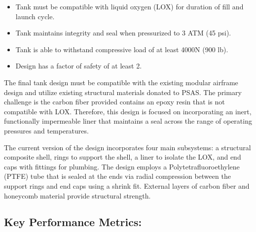 \begin{itemize}[nolistsep]
\item Tank must be compatible with liquid oxygen (LOX) for duration of fill and launch cycle.

\item Tank maintains integrity and seal when pressurized to 3 ATM (45 psi).

\item Tank is able to withstand compressive load of at least 4000N (900 lb).

\item Design has a factor of safety of at least 2.





\end{itemize}
\vspace{0.2cm}
The final tank design must be compatible with the existing modular airframe design  \cite{LV3Airframe} and utilize existing structural materials donated to PSAS. The primary challenge is the carbon fiber provided contains an epoxy resin that is not compatible with LOX. Therefore, this design is focused on incorporating an inert, functionally impermeable liner that maintains a seal across the range of operating pressures and temperatures.

The current version of the design incorporates four main subsystems: a structural composite shell, rings to support the shell, a liner to isolate the LOX, and end caps with fittings for plumbing. The design employs a Polytetrafluoroethylene (PTFE) tube that is sealed at the ends via radial compression between the support rings and end caps using a shrink fit. External layers of carbon fiber and honeycomb material provide structural strength. 

\subsection{Key Performance Metrics:}

